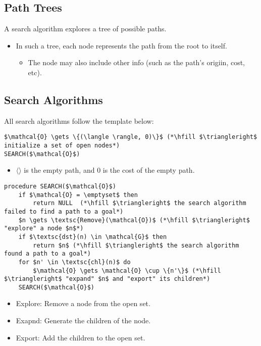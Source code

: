 \subsection{Path Trees}
\begin{definition}
    A search algorithm explores a tree of possible paths. 
    \begin{itemize}
        \item In such a tree, each node represents the path from the root to itself.
        \begin{itemize}
            \item The node may also include other info (such as the path's origiin, cost, etc).
        \end{itemize}
    \end{itemize}
\end{definition}

\subsection{Search Algorithms}
\begin{definition}
    All search algorithms follow the template below:

\begin{lstlisting}
$\mathcal{O} \gets \{(\langle \rangle, 0)\}$ (*\hfill $\triangleright$ initialize a set of open nodes*) 
SEARCH($\mathcal{O}$)
\end{lstlisting}
\begin{itemize}
    \item $\langle \rangle$ is the empty path, and $0$ is the cost of the empty path.
\end{itemize}

\begin{lstlisting}
procedure SEARCH($\mathcal{O}$)
    if $\mathcal{O} = \emptyset$ then
        return NULL  (*\hfill $\triangleright$ the search algorithm failed to find a path to a goal*)
    $n \gets \textsc{Remove}(\mathcal{O})$ (*\hfill $\triangleright$ "explore" a node $n$*)
    if $\textsc{dst}(n) \in \mathcal{G}$ then
        return $n$ (*\hfill $\triangleright$ the search algorithm found a path to a goal*)
    for $n' \in \textsc{chl}(n)$ do
        $\mathcal{O} \gets \mathcal{O} \cup \{n'\}$ (*\hfill $\triangleright$ "expand" $n$ and "export" its children*)
    SEARCH($\mathcal{O}$)
\end{lstlisting}
\begin{itemize}
    \item Explore: Remove a node from the open set.
    \item Exapnd: Generate the children of the node.
    \item Export: Add the children to the open set.
\end{itemize}

\end{definition}

